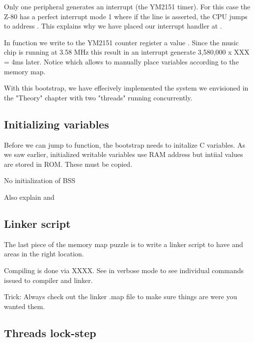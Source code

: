 Only one peripheral generates an interrupt (the YM2151 timer). For this case the Z-80 has a perfect interrupt mode 1 where if the  line is asserted, the CPU jumps to address . This explains why we have placed our interrupt handler at .



In function  we write to the YM2151 counter register a value . Since the music chip is running at 3.58 MHz this result in an interrupt generate 3,580,000 x XXX = 4ms later. Notice  which allows to manually place variables according to the memory map.

With this bootstrap, we have effecively implemented the system we envisioned in the "Theory" chapter with two "threads" running concurrently.

\subsection{Initializing variables}
Before we can jump to  function, the bootstrap needs to initalize C variables. As we saw earlier, initialized writable variables use RAM address but intiial values are stored in ROM. These must be copied.




 

No initialization of BSS

Also explain  and 

\subsection{Linker script}

The last piece of the memory map puzzle is to write a linker script to have  and  areas in the right location.



Compiling is done via XXXX. See  in verbose mode to see individual commands issued to  compiler and  linker.

Trick: Always check out the linker .map file to make sure things are were you wanted them.


\subsection{Threads lock-step}

